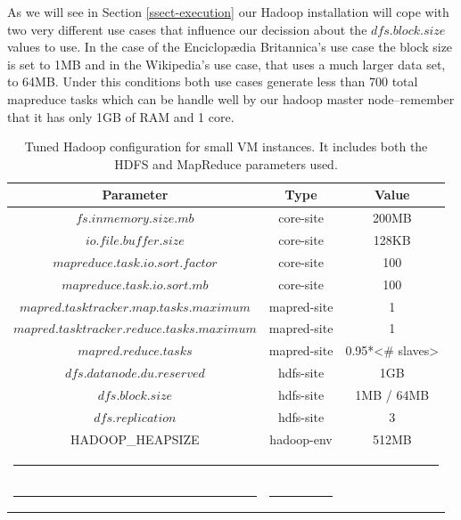\documentclass[oribibl]{llncs_Ibergrid2013}
\begin{document}
As we will see in Section \ref{ssect-execution} our Hadoop installation will cope with two very different use cases that influence our decission about the $dfs.block.size$ values to use. In the case of the Enciclop{\ae}dia Britannica's use case the block size is set to 1MB and in the Wikipedia's use case, that uses a much larger data set, to 64MB. Under this conditions both use cases generate less than 700 total mapreduce tasks which can be handle well by our hadoop master node--remember that it has only 1GB of RAM and 1 core.


\begin{table}[h!]
\caption{Tuned Hadoop configuration for small VM instances. It includes both the HDFS and MapReduce parameters used.}
\label{table-conf}
%
\vspace{-0.5em}
%
\begin{center}
\begin{tabular}{ccc}
\toprule
Parameter				& Type 			& Value	 	\\
\midrule
$fs.inmemory.size.mb$			& core-site		& 200MB	 	\\
$io.file.buffer.size$                  	& core-site		& 128KB  	\\
$mapreduce.task.io.sort.factor$ 	& core-site		& 100	 	\\
$mapreduce.task.io.sort.mb$ 	 	& core-site		& 100	 	\\
$mapred.tasktracker.map.tasks.maximum$ 	& mapred-site		& 1	 	\\
$mapred.tasktracker.reduce.tasks.maximum$ & mapred-site		& 1	 	\\
$mapred.reduce.tasks$ 			& mapred-site		& 0.95*<\# slaves>\\
$dfs.datanode.du.reserved$ 		& hdfs-site		& 1GB	 	\\
$dfs.block.size$ 			& hdfs-site		& 1MB / 64MB 	\\
$dfs.replication$ 			& hdfs-site		& 3	 	\\
HADOOP\_HEAPSIZE            	 	& hadoop-env   		& 512MB 	\\
%
%
\bottomrule
\multicolumn{3}{c}{\rule{0.98\textwidth}{0em}}\\
\rule{0.3\textwidth}{0cm} & \rule{0.2\textwidth}{0cm} &  \\
\end{tabular}
\end{center}
\end{table}
\end{document}
